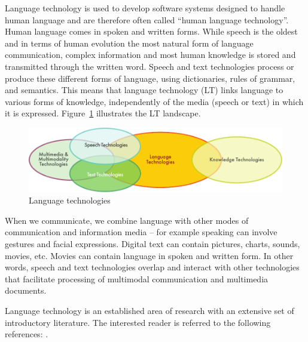 

\begin{multicols}{2}
Language technology is used to develop software systems designed to handle human language and are therefore often called “human language technology”. Human language comes in spoken and written forms. While speech is the oldest and in terms of human evolution the most natural form of language communication, complex information and most human knowledge is stored and transmitted through the written word. Speech and text technologies process or produce these different forms of language, using dictionaries, rules of grammar, and semantics. This means that language technology (LT) links language to various forms of knowledge, independently of the media (speech or text) in which it is expressed. Figure~\ref{fig:ltincontext_en} illustrates the LT landscape.

\begin{figure}[htb]
  \center
  \includegraphics[width=\textwidth]{../_media/english/language_technologies}
  \caption{Language technologies}
\label{fig:ltincontext_en}
\end{figure}

 When we communicate, we combine language with other modes of communication and information media – for example speaking can involve gestures and facial expressions. Digital text can contain pictures, charts, sounds, movies, etc. Movies can contain language in spoken and written form. In other words, speech and text technologies overlap and interact with other technologies that facilitate processing of multimodal communication and multimedia documents.

 Language technology is an established area of research with an extensive set of introductory literature. The interested reader is referred to the following references: \cite{carstensen-etal1, jurafsky-martin01, manning-schuetze1, lt-world1, lt-survey1}.


\end{multicols}
